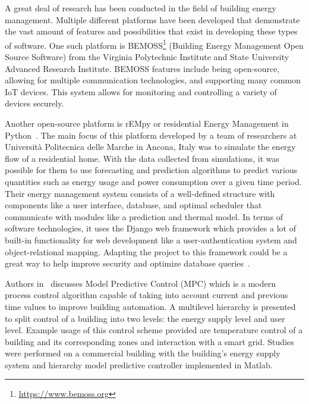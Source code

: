 \documentclass[conference]{IEEEtran}
\begin{document}

A great deal of research has been conducted in the field of building energy
management. Multiple different platforms have been developed that demonstrate
the vast amount of features and possibilities that exist in developing these
types of software. One such platform is
BEMOSS\footnote{\href{https://www.bemoss.org}{https://www.bemoss.org}} (Building
Energy Management Open Source Software) from the Virginia Polytechnic Institute
and State University Advanced Research Institute. BEMOSS features include being
open-source, allowing for multiple communication technologies, and supporting
many common IoT devices. This system allows for monitoring and controlling a
variety of devices securely.

Another open-source platform is rEMpy or residential Energy Management in
Python~\cite{FAGIANI2018131}. The main focus of this platform developed by a team of researchers at
Universit\`{a} Politecnica delle Marche in Ancona, Italy was to simulate the
energy flow of a residential home. With the data collected from simulations, it
was possible for them to use forecasting and prediction algorithms to predict
various quantities such as energy usage and power consumption over a given time period. Their energy management system consists of a well-defined structure with components like a user interface, database, and optimal scheduler that communicate with modules like a prediction and thermal model. In terms of software technologies, it uses the Django web framework which provides a lot of built-in functionality for web development like a user-authentication system and object-relational mapping. Adapting the project to this framework could be a great way to help improve security and optimize database queries~\cite{fagiani2017}.

Authors in~\cite{Mayer2017} discusses Model Predictive Control (MPC)
which is a modern process control algorithm capable of taking into account
current and previous time values to improve building
automation. A multilevel hierarchy is presented to split
control of a building into two levels: the energy supply level and user level.
Example usage of this control scheme provided are temperature control of a
building and its corresponding zones and interaction with a smart grid. Studies
were performed on a commercial building with the building's energy supply system
and hierarchy model predictive controller implemented in Matlab.
\end{document}
